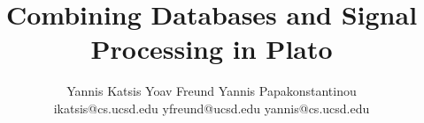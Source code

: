 \documentclass{sig-alternate-cidr}
\newcommand{\projName}{{Plato}}
\begin{document}
\title{Combining Databases and Signal Processing in Plato
}

\author{Yannis Katsis \hspace{1cm} Yoav Freund \hspace{1cm} Yannis Papakonstantinou\\
{\small ikatsis@cs.ucsd.edu \hspace{1cm} yfreund@ucsd.edu \hspace{2cm} yannis@cs.ucsd.edu \hspace*{1cm}}\\\\
\\
}

\maketitle


%
%
%
%	


%
%

{%


}
\end{document}
